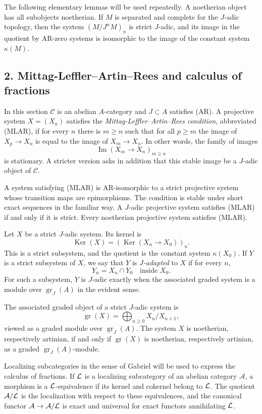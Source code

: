 \documentclass[11pt]{article}
\theoremstyle{plain}
\theoremstyle{definition}
\theoremstyle{remark}
\newcommand{\cA}{\mathcal A}\newcommand{\cB}{\mathcal B}\newcommand{\cC}{\mathcal C}
\DeclareMathOperator{\Ker}{Ker}
\DeclareMathOperator{\Imn}{Im}
\DeclareMathOperator{\gr}{gr}
\begin{document}
The following elementary lemmas will be used repeatedly. A noetherian object has all
subobjects noetherian. If $M$ is separated and complete for the $J$-adic topology,
then the system $(M/J^nM)_n$ is strict $J$-adic, and its image in the quotient by
AR-zero systems is isomorphic to the image of the constant system $\kappa(M)$.

\subsection*{2. Mittag-Leffler--Artin--Rees and calculus of fractions}

In this section $\cC$ is an abelian $A$-category and $J\subset A$ satisfies (AR).
A projective system $X=(X_n)$ satisfies the \emph{Mittag-Leffler--Artin--Rees
condition}, abbreviated (MLAR), if for every $n$ there is $m\ge n$ such that for
all $p\ge m$ the image of $X_p\to X_n$ is equal to the image of $X_m\to X_n$.
In other words, the family of images
\[
       \Imn(X_m\to X_n)_{m\ge n}
\]
is stationary. A stricter version asks in addition that this stable image be a
$J$-adic object of $\cC$.

A system satisfying (MLAR) is AR-isomorphic to a strict projective system whose
transition maps are epimorphisms. The condition is stable under short exact
sequences in the familiar way. A $J$-adic projective system satisfies (MLAR) if and
only if it is strict. Every noetherian projective system satisfies (MLAR).

Let $X$ be a strict $J$-adic system. Its kernel is
\[
      \Ker(X)=(\Ker(X_n\to X_0))_n.
\]
This is a strict subsystem, and the quotient is the constant system $\kappa(X_0)$.
If $Y$ is a strict subsystem of $X$, we say that $Y$ is \emph{$J$-adapted} to $X$ if
for every $n$,
\[
      Y_n=X_n\cap Y_0\quad\text{inside }X_0.
\]
For such a subsystem, $Y$ is $J$-adic exactly when the associated graded system is a
module over $\gr_J(A)$ in the evident sense.

The associated graded object of a strict $J$-adic system is
\[
      \gr(X)=\bigoplus_{n\ge0} X_n/X_{n+1},
\]
viewed as a graded module over $\gr_J(A)$. The system $X$ is noetherian,
respectively artinian, if and only if $\gr(X)$ is noetherian, respectively artinian,
as a graded $\gr_J(A)$-module.

Localizing subcategories in the sense of Gabriel will be used to express the
calculus of fractions. If $\mathcal L$ is a localizing subcategory of an abelian category
$\cA$, a morphism is a $\mathcal L$-equivalence if its kernel and cokernel belong to
$\mathcal L$. The quotient $\cA/\cL$ is the localization with respect to these equivalences,
and the canonical functor $\cA\to\cA/\cL$ is exact and universal for exact functors
annihilating $\mathcal L$.
\end{document}

